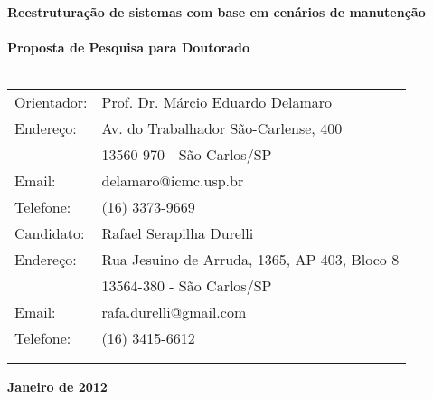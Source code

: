 \documentclass[a4paper,12pt]{article}
\begin{document}
\begin{center}
\vspace*{1cm}
{\fontsize{17.28}{20}\sffamily\bfseries\selectfont Reestruturação de sistemas com base em cenários de manutenção\\\ \\

Proposta de Pesquisa para Doutorado\\ \ \\
\vspace{3cm}}


\begin{table}[!th]
  \begin{center}
    \begin{tabular}{ll}

	  Orientador:      &  Prof. Dr. Márcio Eduardo Delamaro     \\
      Endereço:        &  Av. do Trabalhador São-Carlense, 400                    \\
	                   &  13560-970 - São Carlos/SP                               \\
      Email:           &  delamaro@icmc.usp.br                                     \\
	  
	  \vspace{0.6cm}
      Telefone:        &  (16) 3373-9669                                           \\

	  Candidato:       & Rafael Serapilha Durelli                             \\
	  Endereço:        & Rua Jesuino de Arruda, 1365, AP  403, Bloco 8 \\
                       & 13564-380 - São Carlos/SP                                 \\
      Email:           & rafa.durelli@gmail.com                                      \\
      Telefone:        & (16) 3415-6612                                            \\ \\
      \vspace{1cm}

    \end{tabular}
  \end{center}
\end{table}

\vfill
{\fontsize{18}{20}\sffamily\bfseries\selectfont Janeiro de 2012}

\end{center}
\end{document}
